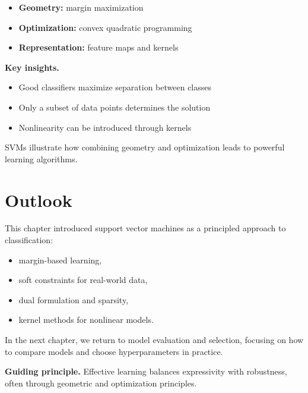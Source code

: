 \begin{itemize}
    \item \textbf{Geometry:} margin maximization
    \item \textbf{Optimization:} convex quadratic programming
    \item \textbf{Representation:} feature maps and kernels
\end{itemize}

\medskip

\noindent
\textbf{Key insights.}
\begin{itemize}
    \item Good classifiers maximize separation between classes
    \item Only a subset of data points determines the solution
    \item Nonlinearity can be introduced through kernels
\end{itemize}

\medskip

\noindent
SVMs illustrate how combining geometry and optimization leads to powerful learning algorithms.

\section{Outlook}

This chapter introduced support vector machines as a principled approach to classification:
\begin{itemize}
    \item margin-based learning,
    \item soft constraints for real-world data,
    \item dual formulation and sparsity,
    \item kernel methods for nonlinear models.
\end{itemize}

\medskip

In the next chapter, we return to model evaluation and selection, focusing on how to compare models and choose hyperparameters in practice.

\medskip

\noindent
\textbf{Guiding principle.}  
Effective learning balances expressivity with robustness, often through geometric and optimization principles.